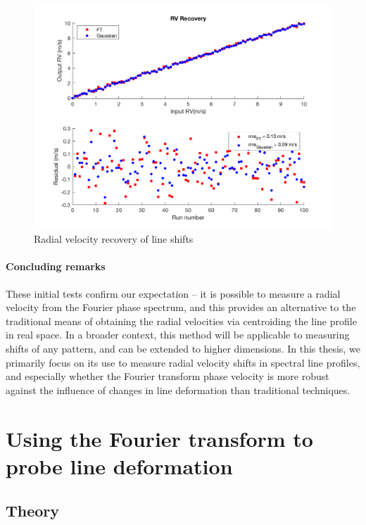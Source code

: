 \begin{figure}[htbp]
\centering
\includegraphics[width = 0.8 \linewidth]
{./Figures/Methods/5-LINE_SHIFT_ONLY.png}
\caption[Radial velocity recovery]
{Radial velocity recovery of line shifts}
\label{fig:rv_recovery}
\end{figure} 

\paragraph{Concluding remarks}
These initial  tests confirm our expectation --  it is possible to measure a radial velocity from
the Fourier phase spectrum, and this provides an alternative to the traditional 
means of obtaining the radial velocities via centroiding the line profile in real space. 
In a broader context, this method will be applicable to measuring shifts of any pattern, and  
can be extended to higher dimensions. In this thesis, we primarily focus on its use to measure radial velocity shifts 
in spectral line profiles, and especially whether the Fourier transform phase velocity is more
robust against the influence of changes in line deformation than traditional techniques.


\section{Using the Fourier transform to probe line deformation}
\label{\thesection}
\label{sec:FT_ld}


\subsection{Theory}
\label{sec:LD_Theory}

